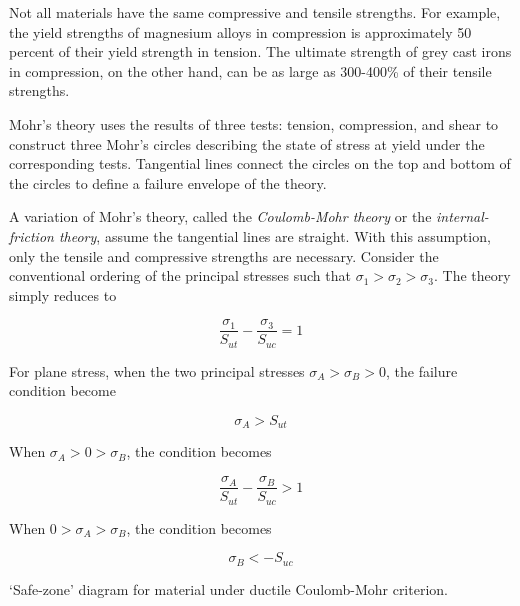 \documentclass[
10pt,
a4paper,
openany,
svgnames,
]{kaobook} %
\begin{document}
Not all materials have the same compressive and tensile strengths. For example, the yield strengths of magnesium alloys in compression is approximately 50 percent of their yield strength in tension. The ultimate strength of grey cast irons in compression, on the other hand, can be as large as 300-400\% of their tensile strengths.

Mohr’s theory uses the results of three tests: tension, compression, and shear to construct three Mohr’s circles describing the state of stress at yield under the corresponding tests. Tangential lines connect the circles on the top and bottom of the circles to define a failure envelope of the theory.

A variation of Mohr’s theory, called the \emph{Coulomb-Mohr theory} or the \emph{internal-friction theory}, assume the tangential lines are straight. With this assumption, only the tensile and compressive strengths are necessary. Consider the conventional ordering of the principal stresses such that $\sigma_1 > \sigma_2 > \sigma_3$. The theory simply reduces to 

\[\frac{\sigma_1}{S_{ut}} - \frac{\sigma_3}{S_{uc}} = 1\]

For plane stress, when the two principal stresses $\sigma_A > \sigma_B > 0$, the failure condition become

\[\sigma_A > S_{ut}\]

When  $\sigma_A > 0 > \sigma_B$, the condition becomes

\[\frac{\sigma_A}{S_{ut}} - \frac{\sigma_B}{S_{uc}} > 1\]

When  $0 > \sigma_A > \sigma_B$, the condition becomes

\[\sigma_B <  - S_{uc}\]

\begin{marginfigure}
  \centering
  \caption{`Safe-zone' diagram for material under ductile Coulomb-Mohr criterion.}
  \label{fig: Coulomb-Mohr ductile safe zone}
\end{marginfigure}
\end{document}
